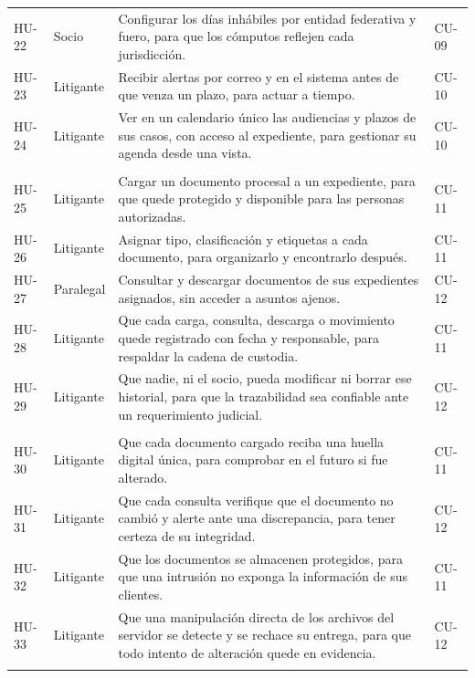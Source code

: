 {\begin{longtable}{@{}p{1.6cm}L{2.35cm}L{10.25cm}>{\raggedright\arraybackslash}p{1.5cm}@{}}
  HU-22 & Socio & Configurar los días inhábiles por entidad federativa y fuero, para que los cómputos reflejen cada jurisdicción. & CU-09 \\
  HU-23 & Litigante & Recibir alertas por correo y en el sistema antes de que venza un plazo, para actuar a tiempo. & CU-10 \\
  HU-24 & Litigante & Ver en un calendario único las audiencias y plazos de sus casos, con acceso al expediente, para gestionar su agenda desde una vista. & CU-10 \\
  \addlinespace
  \\
  HU-25 & Litigante & Cargar un documento procesal a un expediente, para que quede protegido y disponible para las personas autorizadas. & CU-11 \\
  HU-26 & Litigante & Asignar tipo, clasificación y etiquetas a cada documento, para organizarlo y encontrarlo después. & CU-11 \\
  HU-27 & Paralegal & Consultar y descargar documentos de sus expedientes asignados, sin acceder a asuntos ajenos. & CU-12 \\
  HU-28 & Litigante & Que cada carga, consulta, descarga o movimiento quede registrado con fecha y responsable, para respaldar la cadena de custodia. & CU-11 \\
  HU-29 & Litigante & Que nadie, ni el socio, pueda modificar ni borrar ese historial, para que la trazabilidad sea confiable ante un requerimiento judicial. & CU-12 \\
  \addlinespace
  \\
  HU-30 & Litigante & Que cada documento cargado reciba una huella digital única, para comprobar en el futuro si fue alterado. & CU-11 \\
  HU-31 & Litigante & Que cada consulta verifique que el documento no cambió y alerte ante una discrepancia, para tener certeza de su integridad. & CU-12 \\
  HU-32 & Litigante & Que los documentos se almacenen protegidos, para que una intrusión no exponga la información de sus clientes. & CU-11 \\
  HU-33 & Litigante & Que una manipulación directa de los archivos del servidor se detecte y se rechace su entrega, para que todo intento de alteración quede en evidencia. & CU-12 \\
  \addlinespace
  \\

\end{longtable}}
